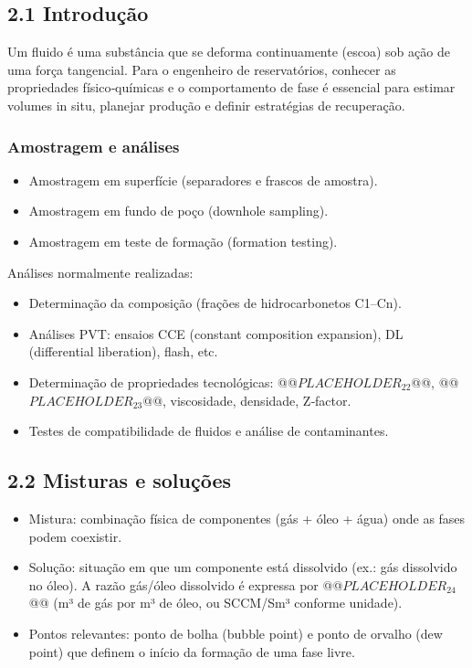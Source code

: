 \documentclass[11pt,a4paper]{article}
\begin{document}
\subsection{2.1 Introdução}
Um fluido é uma substância que se deforma continuamente (escoa) sob ação de uma força tangencial. Para o engenheiro de reservatórios, conhecer as propriedades físico‑químicas e o comportamento de fase é essencial para estimar volumes in situ, planejar produção e definir estratégias de recuperação.

\subsubsection{Amostragem e análises}
\begin{itemize}
\item Amostragem em superfície (separadores e frascos de amostra).
\item Amostragem em fundo de poço (downhole sampling).
\item Amostragem em teste de formação (formation testing).
\end{itemize}

Análises normalmente realizadas:
\begin{itemize}
\item Determinação da composição (frações de hidrocarbonetos C1–Cn).
\item Análises PVT: ensaios CCE (constant composition expansion), DL (differential liberation), flash, etc.
\item Determinação de propriedades tecnológicas: @@$PLACEHOLDER_{22}$@@, @@$PLACEHOLDER_{23}$@@, viscosidade, densidade, Z‑factor.
\item Testes de compatibilidade de fluidos e análise de contaminantes.
\end{itemize}

\subsection{2.2 Misturas e soluções}
\begin{itemize}
\item Mistura: combinação física de componentes (gás + óleo + água) onde as fases podem coexistir.
\item Solução: situação em que um componente está dissolvido (ex.: gás dissolvido no óleo). A razão gás/óleo dissolvido é expressa por @@$PLACEHOLDER_{24}$@@ (m³ de gás por m³ de óleo, ou SCCM/Sm³ conforme unidade).
\item Pontos relevantes: ponto de bolha (bubble point) e ponto de orvalho (dew point) que definem o início da formação de uma fase livre.
\end{itemize}
\end{document}
